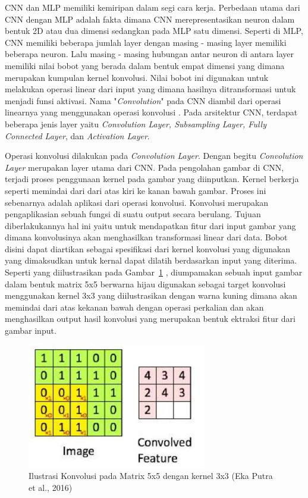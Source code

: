 \par CNN dan MLP memiliki kemiripan dalam segi cara kerja. Perbedaan utama dari CNN dengan MLP adalah fakta
dimana CNN merepresentasikan neuron dalam bentuk 2D atau dua dimensi sedangkan pada MLP satu dimensi.
Seperti di MLP, CNN memiliki beberapa jumlah layer dengan masing - masing layer memiliki beberapa neuron.
Lalu masing - masing hubungan antar neuron di antara layer memiliki nilai bobot yang berada dalam bentuk empat dimensi
yang dimana merupakan kumpulan kernel konvolusi. Nilai bobot ini digunakan untuk melakukan operasi linear 
dari input yang dimana hasilnya ditransformasi untuk menjadi funsi aktivasi. Nama "\emph{Convolution}" pada 
CNN diambil dari operasi linearnya yang menggunakan operasi konvolusi \cite{putra2016klasifikasi}.
Pada arsitektur CNN, terdapat beberapa jenis layer yaitu \emph{Convolution Layer, Subsampling Layer, 
Fully Connected Layer}, dan \emph{Activation Layer}.

\par Operasi konvolusi dilakukan pada \emph{Convolution Layer}. Dengan begitu \emph{Convolution Layer} merupakan
layer utama dari CNN. Pada pengolahan gambar di CNN, terjadi proses penggunaan kernel pada gambar yang diinputkan.
Kernel berkerja seperti memindai dari dari atas kiri ke kanan bawah gambar. Proses ini sebenarnya adalah aplikasi 
dari operasi konvolusi. Konvolusi merupakan pengaplikasian sebuah fungsi di suatu output secara berulang. Tujuan
diberlakukannya hal ini yaitu untuk mendapatkan fitur dari input gambar yang dimana konvolusinya akan menghasilkan
transformasi linear dari data. Bobot disini dapat diartikan sebagai spesifikasi dari kernel konvolusi yang digunakan yang
dimaksudkan untuk kernal dapat dilatih berdasarkan input yang diterima. Seperti yang diilustrasikan pada Gambar~\ref{fig:ilutrasikonvolusi} , diumpamakan sebuah
input gambar dalam bentuk matrix 5x5 berwarna hijau digunakan sebagai target konvolusi menggunakan kernel 3x3 yang diilustrasikan dengan
warna kuning dimana akan memindai dari atas kekanan bawah dengan operasi perkalian dan akan menghasilkan output hasil konvolusi yang
merupakan bentuk ektraksi fitur dari gambar input.

\begin{figure}[ht]
    \centering
    \includegraphics[scale=1]{gambar/convolution_simulation.jpg}
    \caption{Ilustrasi Konvolusi pada Matrix 5x5 dengan kernel 3x3 (Eka Putra et al., 2016)}
    \label{fig:ilutrasikonvolusi}  
\end{figure}

